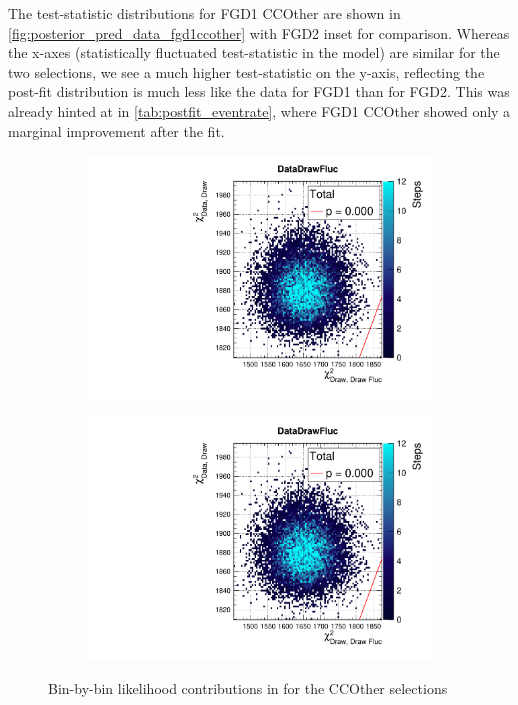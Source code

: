 The test-statistic distributions for FGD1 CCOther are shown in \autoref{fig:posterior_pred_data_fgd1ccother} with FGD2 inset for comparison. Whereas the x-axes (statistically fluctuated test-statistic in the model) are similar for the two selections, we see a much higher test-statistic on the y-axis, reflecting the post-fit distribution is much less like the data for FGD1 than for FGD2. This was already hinted at in \autoref{tab:postfit_eventrate}, where FGD1 CCOther showed only a marginal improvement after the fit.
\begin{figure}[h]
	\begin{subfigure}[t]{0.49\textwidth}
		\includegraphics[width=\textwidth, trim={0mm 6mm 0mm 11mm}, clip,page=16]{figures/mach3/data/postpred/2017b_NewData_NewDet_UpdXsecStep_2Xsec_4Det_5Flux_0_PostPred_procs}
	\end{subfigure}
\begin{subfigure}[t]{0.49\textwidth}
	\includegraphics[width=\textwidth, trim={0mm 6mm 0mm 11mm}, clip,page=52]{figures/mach3/data/postpred/2017b_NewData_NewDet_UpdXsecStep_2Xsec_4Det_5Flux_0_PostPred_procs}
\end{subfigure}
	\caption{Bin-by-bin likelihood contributions in \pmu \cosmu for the CCOther selections}
	\label{fig:posterior_pred_data_fgd1ccother}
\end{figure}

